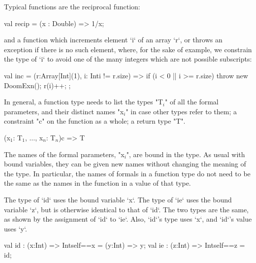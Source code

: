 \begin{ex}Typical functions are the reciprocal function: 
\begin{xten}
val recip = (x : Double) => 1/x;
\end{xten}
and a function which increments  element \xcd`i` of an array \xcd`r`, or throws an exception
if there is no such element, where, for the sake of example, we constrain the
type of \xcd`i` to avoid one of the many integers which are not possible subscripts:  
\begin{xten}
val inc = (r:Array[Int](1), i: Int{i != r.size}) => {
  if (i < 0 || i >= r.size) throw new DoomExn();
  r(i)++;
};
\end{xten}
\end{ex}

In general, a function type needs to list the types 
\xcdmath"T$_i$"
of all the formal parameters,
and their distinct names \xcdmath"x$_i$" in case other types refer to them; a
constraint 
\xcd"c" on the
function as a whole; a return type \xcd"T".

\begin{xtenmath}
(x$_1$: T$_1$, $\dots$, x$_n$: T$_n$){c} => T
\end{xtenmath}


The names of the formal parameters, \xcdmath"x$_i$", are bound in the type.  
As usual with bound variables, they can be given new names without changing the
meaning of the type.  In particular, the names of formals in a function type
do not need to be the same as the names in the function in a value of that type.

\begin{ex}
The type of \xcd`id` uses the bound variable \xcd`x`.  
The type of \xcd`ie`
uses the bound variable \xcd`z`, but is otherwise identical to that of
\xcd`id`.  The two types are the same, as shown by the assignment of \xcd`id`
to  \xcd`ie`.  Also, \xcd`id`'s type uses \xcd`x`, and \xcd`id`'s value uses \xcd`y`.
\begin{xten}
val id : (x:Int) => Int{self==x} 
       = (y:Int) => y;
val ie : (z:Int) => Int{self==z}
       = id;
\end{xten}


\end{ex}


